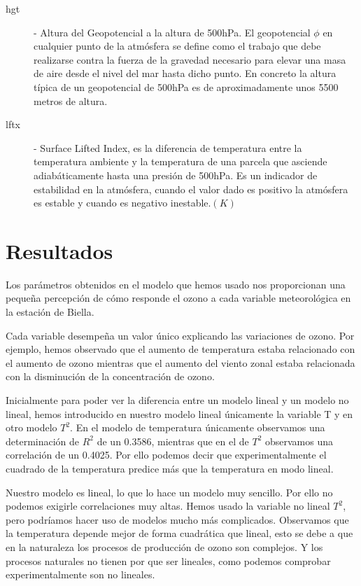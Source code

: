 \documentclass[12pt]{article}
\begin{document}
\begin{description}
\item[hgt] \label{itm:hgt} - Altura del Geopotencial a la altura de 500hPa. El geopotencial $\phi$ en cualquier punto de la atmósfera se define como el trabajo que debe realizarse contra la fuerza de la gravedad necesario para elevar una masa de aire desde el nivel del mar hasta dicho punto. En concreto la altura típica de un geopotencial de 500hPa es de aproximadamente unos 5500 metros de altura.
\item[lftx] \label{itm:lftx} -  Surface Lifted Index, es la diferencia de temperatura entre la temperatura ambiente y la temperatura de una parcela que asciende adiabáticamente hasta una presión de 500hPa. Es un indicador de estabilidad en la atmósfera, cuando el valor dado es positivo la atmósfera es estable y cuando es negativo inestable.$(K)$
\end{description}


 

\section{Resultados}
Los parámetros obtenidos en el  modelo que hemos usado nos proporcionan una pequeña percepción de cómo responde el ozono a cada variable meteorológica en la estación de Biella.

Cada variable desempeña un valor único explicando las variaciones de ozono. Por ejemplo, hemos observado que el aumento de temperatura estaba relacionado con el aumento de ozono mientras que el aumento del viento zonal estaba relacionada con la disminución de la concentración de ozono.

Inicialmente para poder ver la diferencia entre un modelo lineal y un modelo no lineal, hemos introducido en nuestro modelo lineal únicamente la variable T y en otro modelo   $T^2$. En el modelo de temperatura únicamente observamos una determinación de $R^2$ de un 0.3586, mientras que en el de $T^2$ observamos una correlación de un 0.4025. Por ello  podemos decir que experimentalmente el cuadrado de la temperatura predice más que la temperatura en modo lineal. 


Nuestro modelo es lineal,  lo que lo hace un  modelo muy sencillo. Por ello no podemos exigirle correlaciones muy altas. Hemos usado la variable no lineal $T^2$, pero podríamos hacer uso de modelos mucho más complicados.  Observamos que la temperatura depende mejor de forma cuadrática que lineal, esto se debe a que en la naturaleza los procesos de producción de ozono son  complejos. Y los procesos naturales no tienen por que ser lineales, como podemos comprobar experimentalmente son no lineales. 
\end{document}
